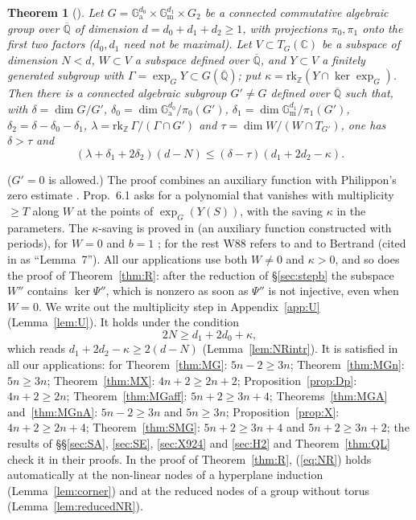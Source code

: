 \documentclass[11pt]{amsart}
\newtheorem{theorem}{Theorem}[section]
\theoremstyle{definition}
\newcommand{\Qb}{\overline{\mathbb{Q}}}
\newcommand{\C}{\mathbb{C}}
\newcommand{\Z}{\mathbb{Z}}
\newcommand{\Ga}{\mathbb{G}_{\mathrm a}}
\newcommand{\Gm}{\mathbb{G}_{\mathrm m}}
\begin{document}
\begin{theorem}[{\cite[Thm.~4.1, pp.~385--386]{W88}}]\label{thm:W88}
Let $G=\Ga^{d_0}\times\Gm^{d_1}\times G_2$ be a connected commutative algebraic group over $\Qb$ of dimension
$d=d_0+d_1+d_2\ge1$, with projections $\pi_0,\pi_1$ onto the first two factors ($d_0,d_1$ need not be maximal). Let
$V\subset T_G(\C)$ be a subspace of dimension $N<d$, $W\subset V$ a subspace defined over $\Qb$, and $Y\subset V$ a
finitely generated subgroup with $\Gamma=\exp_GY\subset G(\Qb)$; put $\kappa=\mathrm{rk}_\Z(Y\cap\ker\exp_G)$. Then there
is a connected algebraic subgroup $G'\neq G$ defined over $\Qb$ such that, with $\delta=\dim G/G'$,
$\delta_0=\dim\Ga^{d_0}/\pi_0(G')$, $\delta_1=\dim\Gm^{d_1}/\pi_1(G')$, $\delta_2=\delta-\delta_0-\delta_1$,
$\lambda=\mathrm{rk}_\Z\,\Gamma/(\Gamma\cap G')$ and $\tau=\dim W/(W\cap T_{G'})$, one has $\delta>\tau$ and
\begin{equation}\label{eq:41}
(\lambda+\delta_1+2\delta_2)(d-N)\le(\delta-\tau)(d_1+2d_2-\kappa).
\end{equation}
\end{theorem}
\noindent ($G'=0$ is allowed.) The proof \cite[\S\S6--7]{W88} combines an auxiliary function
\cite[Prop.~6.1]{W88} with Philippon's zero estimate \cite{Ph86}. Prop.~6.1 asks for a polynomial that vanishes with
multiplicity $\ge T$ along $W$ at the points of $\exp_G(Y(S))$, with the saving $\kappa$ in the parameters. The
$\kappa$-saving is proved in \cite[Prop.~2.1 and 2.4]{W83} (an auxiliary function constructed with periods), for $W=0$
and $b=1$ \cite[p.~396]{W88}; for the rest W88 refers to \cite{W83} and to Bertrand \cite[App.~I, Lemme~7 and its
Corollaire, with Lemme~1]{W79} (cited in \cite[p.~396]{W88} as ``Lemma~7''). All our applications use both $W\ne0$ and
$\kappa>0$, and so does the proof of Theorem~\ref{thm:R}: after the reduction of \S\ref{sec:stepb} the subspace $W''$
contains $\ker\Psi''$, which is nonzero as soon as $\Psi''$ is not injective, even when $W=0$. We write out the
multiplicity step in Appendix~\ref{app:U} (Lemma~\ref{lem:U}). It holds under the condition
\begin{equation}\label{eq:NR}
2N\ge d_1+2d_0+\kappa ,
\end{equation}
which reads $d_1+2d_2-\kappa\ge2(d-N)$ (Lemma~\ref{lem:NRintr}). It is satisfied in all our applications: for
Theorem~\ref{thm:MG}: $5n-2\ge3n$; Theorem~\ref{thm:MGn}: $5n\ge3n$; Theorem~\ref{thm:MX}: $4n+2\ge2n+2$;
Proposition~\ref{prop:Dp}: $4n+2\ge2n$; Theorem~\ref{thm:MGaff}: $5n+2\ge3n+4$; Theorems~\ref{thm:MGA} and~\ref{thm:MGnA}:
$5n-2\ge3n$ and $5n\ge3n$; Proposition~\ref{prop:X}: $4n+2\ge2n+4$; Theorem~\ref{thm:SMG}: $5n+2\ge3n+4$ and
$5n+2\ge3n+2$; the results of \S\S\ref{sec:SA}, \ref{sec:SE}, \ref{sec:X924} and \ref{sec:H2} and Theorem~\ref{thm:QL} check
it in their proofs. In the proof of Theorem~\ref{thm:R}, (\ref{eq:NR}) holds automatically at the non-linear nodes of a
hyperplane induction (Lemma~\ref{lem:corner}) and at the reduced nodes of a group without torus
(Lemma~\ref{lem:reducedNR}).
\end{document}
